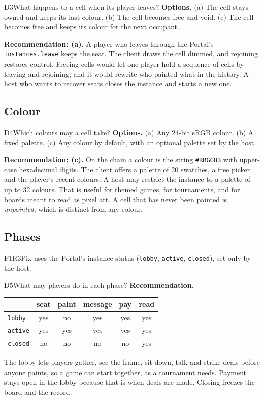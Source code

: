 \documentclass[11pt,a4paper]{article}
\newcommand{\code}[1]{\texttt{#1}}
\begin{document}
\begin{decision}{D3}{What happens to a cell when its player leaves?}
\textbf{Options.} (a) The cell stays owned and keeps its last colour. (b) The cell becomes free
and void. (c) The cell becomes free and keeps its colour for the next occupant.

\textbf{Recommendation: (a).} A player who leaves through the Portal's \code{instances.leave}
keeps the seat. The client draws the cell dimmed, and rejoining restores control. Freeing cells
would let one player hold a sequence of cells by leaving and rejoining, and it would rewrite who
painted what in the history. A host who wants to recover seats closes the instance and starts
a new one.
\end{decision}

\subsection{Colour}

\begin{decision}{D4}{Which colours may a cell take?}
\textbf{Options.} (a) Any 24-bit sRGB colour. (b) A fixed palette. (c) Any colour by
default, with an optional palette set by the host.

\textbf{Recommendation: (c).} On the chain a colour is the string \code{\#RRGGBB} with
upper-case hexadecimal digits. The client offers a palette of 20 swatches, a free picker and
the player's recent colours. A host may restrict the instance to a palette of up to 32
colours. That is useful for themed games, for tournaments, and for boards meant to read as
pixel art. A cell that has never been painted is \emph{unpainted}, which is distinct from any
colour.
\end{decision}

\subsection{Phases}

F1R3Pix uses the Portal's instance status (\code{lobby}, \code{active}, \code{closed}), set only
by the host.

\begin{decision}{D5}{What may players do in each phase?}
\textbf{Recommendation.}

\begin{tabular}{@{}lccccc@{}}
\toprule
 & seat & paint & message & pay & read \\
\midrule
\code{lobby}  & yes & no  & yes & yes & yes\\
\code{active} & yes & yes & yes & yes & yes\\
\code{closed} & no  & no  & no  & no  & yes\\
\bottomrule
\end{tabular}

The lobby lets players gather, see the frame, sit down, talk and strike deals before anyone
paints, so a game can start together, as a tournament needs. Payment stays open in the lobby
because that is when deals are made. Closing freezes the board and the record.
\end{decision}
\end{document}
